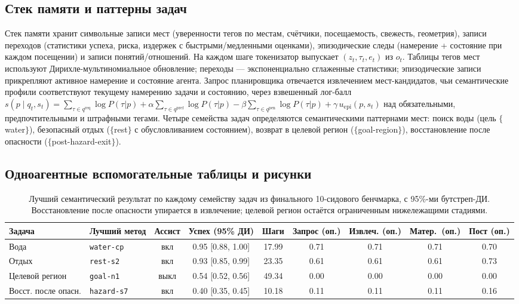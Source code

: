 \documentclass{article}
\newcommand{\method}[1]{\texttt{#1}}
\begin{document}
\subsection{Стек памяти и паттерны задач}

Стек памяти хранит символьные записи мест (уверенности тегов по местам, счётчики, посещаемость, свежесть, геометрия), записи переходов (статистики успеха, риска, издержек с быстрыми/медленными оценками), эпизодические следы (намерение + состояние при каждом посещении) и записи понятий/отношений. На каждом шаге токенизатор выпускает $(z_t, \tau_t, e_t)$ из $o_t$. Таблицы тегов мест используют Дирихле-мультиномиальное обновление; переходы --- экспоненциально сглаженные статистики; эпизодические записи прикрепляют активное намерение и состояние агента. Запрос планировщика отвечается извлечением мест-кандидатов, чьи семантические профили соответствуют текущему намерению задачи и состоянию, через взвешенный лог-балл
$s(p \mid q_t, s_t) = \sum_{\tau \in q^{\mathrm{req}}} \log P(\tau|p)
+ \alpha \sum_{\tau \in q^{\mathrm{pref}}} \log P(\tau|p)
- \beta \sum_{\tau \in q^{\mathrm{pen}}} \log P(\tau|p)
+ \gamma\, u_{\mathrm{epi}}(p, s_t)$
над обязательными, предпочтительными и штрафными тегами. Четыре семейства задач определяются семантическими паттернами мест: поиск воды (цель $\{$water$\}$), безопасный отдых ($\{$rest$\}$ с обусловливанием состоянием), возврат в целевой регион ($\{$goal-region$\}$), восстановление после опасности ($\{$post-hazard-exit$\}$).

\subsection{Одноагентные вспомогательные таблицы и рисунки}
\label{p1:app:single-results-table}

\begin{table}[!ht]
  \caption{Лучший семантический результат по каждому семейству задач из финального 10-сидового бенчмарка, с 95\%-ми бутстреп-ДИ. Восстановление после опасности упирается в извлечение; целевой регион остаётся ограниченным нижележащими стадиями.}
  \label{p1:tab:main-results}
  \centering
  \scriptsize
  \setlength{\tabcolsep}{3.5pt}
  \begin{tabular}{p{1.5cm}p{1.7cm}c c c c c c c}
    \toprule
    Задача & Лучший метод & Ассист & Успех (95\% ДИ) & Шаги & Запрос (оп.) & Извлеч. (оп.) & Матер.\ (оп.) & Пост (оп.) \\
    \midrule
    Вода & \method{water-cp} & вкл & 0.95 [0.88, 1.00] & 17.99 & 0.71 & 0.71 & 0.71 & 0.70 \\
    Отдых & \method{rest-s2} & вкл & 0.93 [0.85, 0.99] & 23.35 & 0.61 & 0.61 & 0.61 & 0.73 \\
    Целевой регион & \method{goal-n1} & выкл & 0.54 [0.52, 0.56] & 49.34 & 0.00 & 0.00 & 0.00 & 0.00 \\
    Восст. после опасн. & \method{hazard-s7} & вкл & 0.40 [0.35, 0.45] & 10.18 & 0.11 & 0.11 & 0.11 & 0.16 \\
    \bottomrule
  \end{tabular}
\end{table}
\end{document}
